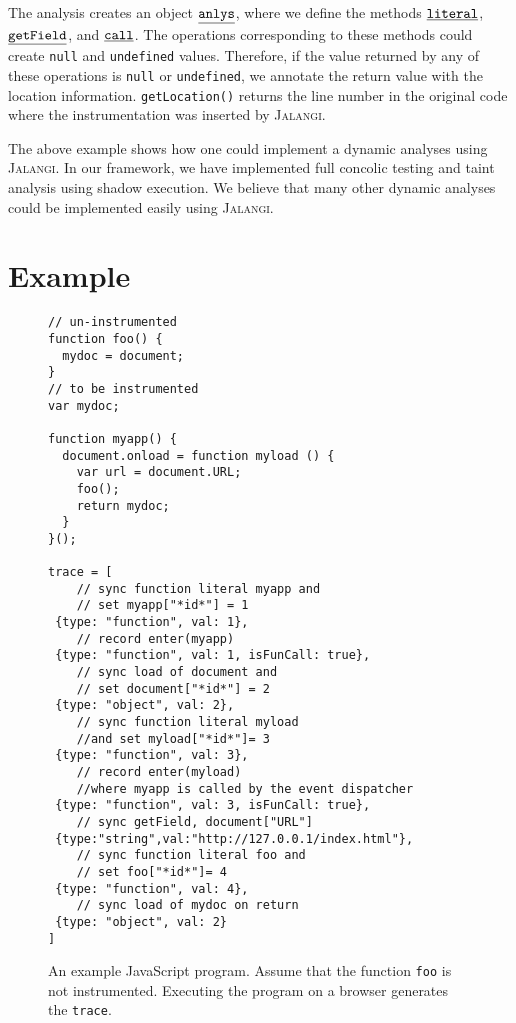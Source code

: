 \documentclass{sig-alternate}
\def\jalangi{\textsc{Jalangi}}
\newcommand \usl [1] {\mbox{\underline{\tt #1}}\xspace}
\newcommand \analysis{\usl{anlys}}
\begin{document}
The analysis creates an object $\analysis$, where we define the
methods $\usl{literal}$, $\usl{getField}$, and $\usl{call}$.  The
operations corresponding to these methods could create \texttt{null}
and \texttt{undefined} values.  Therefore, if the value returned by
any of these operations is \texttt{null} or \texttt{undefined}, we
annotate the return value with the location information.
\texttt{getLocation()} returns the line number in the original code
where the instrumentation was inserted by \jalangi{}.

The above example shows how one could implement a dynamic analyses
using \jalangi{}.  In our framework, we have implemented full concolic
testing and taint analysis using shadow execution.  We believe that
many other dynamic analyses could be implemented easily using
\jalangi{}.

\section{Example}
\label{sec:example}

\begin{figure}
 {\scriptsize
\begin{lstlisting}[mathescape]
// un-instrumented
function foo() {
  mydoc = document;
}
// to be instrumented
var mydoc;

function myapp() {
  document.onload = function myload () {
    var url = document.URL;
    foo();
    return mydoc;
  }
}();

trace = [
    // sync function literal myapp and 
    // set myapp["*id*"] = 1  
 {type: "function", val: 1},
    // record enter(myapp)
 {type: "function", val: 1, isFunCall: true}, 
    // sync load of document and 
    // set document["*id*"] = 2
 {type: "object", val: 2}, 
    // sync function literal myload 
    //and set myload["*id*"]= 3 
 {type: "function", val: 3}, 
    // record enter(myload) 
    //where myapp is called by the event dispatcher  
 {type: "function", val: 3, isFunCall: true}, 
    // sync getField, document["URL"]
 {type:"string",val:"http://127.0.0.1/index.html"}, 
    // sync function literal foo and 
    // set foo["*id*"]= 4
 {type: "function", val: 4}, 
    // sync load of mydoc on return
 {type: "object", val: 2} 
]
\end{lstlisting}
}
  \caption{An example JavaScript program.  Assume that the function
    \texttt{foo} is not instrumented.  Executing the program on a
    browser generates the \texttt{trace}.  }
  \label{fig:example}
\end{figure}
\end{document}
